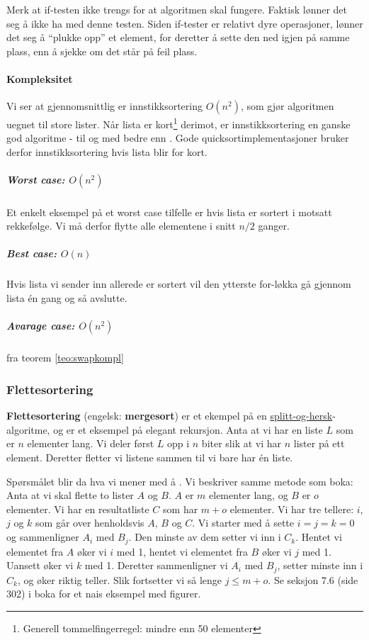 
Merk at if-testen ikke trengs for at algoritmen skal fungere.
Faktisk lønner det seg å ikke ha med denne testen.
Siden if-tester er relativt dyre operasjoner, lønner det seg å ``plukke opp'' et
element, for deretter å sette den ned igjen på samme plass, enn å sjekke om det
står på feil plass.
~\\
\paragraph{Kompleksitet}
Vi ser at gjennomsnittlig er innstikksortering $ O(n^2) $, som gjør algoritmen uegnet til store lister. Når lista er kort\footnote{Generell tommelfingerregel: mindre enn 50 elementer} derimot, er innstikksortering en ganske god algoritme - til og med bedre enn . Gode quicksortimplementasjoner bruker derfor innstikksortering hvis lista blir for kort. 

\subparagraph{Worst case: $ O(n^2) $} Et enkelt eksempel på et worst case tilfelle er hvis lista er sortert i motsatt rekkefølge. Vi må derfor flytte alle elementene i snitt $ n/2 $ ganger.

\subparagraph{Best case: $ O(n) $} Hvis lista vi sender inn allerede er sortert vil den ytterste for-løkka gå gjennom lista én gang og så avslutte. 

\subparagraph{Avarage case: $ O(n^2) $} fra teorem \ref{teo:swapkompl}


\newpage
\subsubsection{Flettesortering}\label{mergesort}
\textbf{Flettesortering} (engelsk: \textbf{mergesort}) er et ekempel på en \hyperref[splitthersk]{splitt-og-hersk}-algoritme, og er et eksempel på elegant rekursjon. Anta at vi har en liste $ L $ som er $ n $ elementer lang. Vi deler først $ L $ opp i $ n $ biter slik at vi har $ n $ lister på ett element. Deretter fletter vi listene sammen til vi bare har én liste. 

Spørsmålet blir da hva vi mener med å . Vi beskriver samme metode som boka: Anta at vi skal flette to lister $ A $ og $ B $. $ A $ er $ m $ elementer lang, og $ B $ er $ o $ elementer. Vi har en resultatliste $ C $ som har $ m+o $ elementer. Vi har tre tellere: $ i $, $ j $ og $ k $ som går over henholdsvis $ A $, $ B $ og $ C $. Vi starter med å sette $ i=j=k=0 $ og sammenligner $ A_i $ med $ B_j $. Den minste av dem setter vi inn i $ C_k $. Hentet vi elementet fra $ A $ øker vi $ i $ med 1, hentet vi elementet fra $ B $ øker vi $ j $ med 1. Uansett øker vi $ k $ med 1. Deretter sammenligner vi $ A_i $ med $ B_j $, setter minste inn i $ C_k $, og øker riktig teller. Slik fortsetter vi så lenge $ j \leq m+o $. Se seksjon 7.6 (side 302) i boka for et nais eksempel med figurer. 

